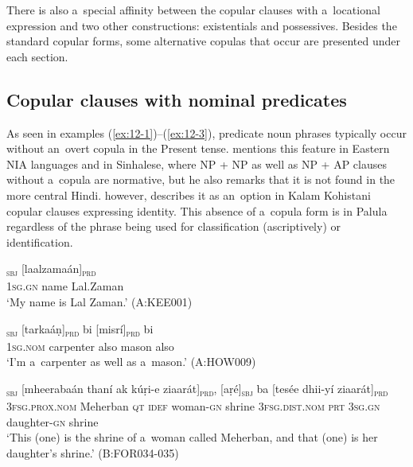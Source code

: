 There is also a~special affinity between the copular clauses with a~locational expression and two other constructions: existentials and possessives. Besides the standard copular forms, some alternative copulas that occur are presented under each section.


\subsection{Copular clauses with nominal predicates}
\label{subsec:12-1-1}


As seen in examples (\ref{ex:12-1})--(\ref{ex:12-3}), predicate noun phrases typically occur without an~overt copula in the Present tense. \citet[337]{masica1991} mentions this feature in Eastern NIA languages and in Sinhalese, where NP + NP as well as NP + AP clauses without a~copula are normative, but he also remarks that it is not found in the more central Hindi. \citet[118--122]{baart1999a} however, describes it as an~option in Kalam Kohistani copular clauses expressing identity. This absence of a~copula form is in Palula regardless of the phrase being used for classification (ascriptively) or identification. 

\begin{exe}
\ex
\label{ex:12-1}
\textsubscript{\textsc{sbj}} [laalzamaán]\textsubscript{\textsc{prd}} \\
\textsc{1sg.gn} name Lal.Zaman  \\
\glt `My name is Lal Zaman.' (A:KEE001)
\end{exe}
\begin{exe}
\ex
\label{ex:12-2}
\gll [ma]\textsubscript{\textsc{sbj}} [tarkaáṇ]\textsubscript{\textsc{prd}} bi
     [misrí]\textsubscript{\textsc{prd}} bi \\
\textsc{1sg.nom} carpenter also mason also  \\
\glt `I'm a~carpenter as well as a~mason.' (A:HOW009)

\ex
\label{ex:12-3}
\gll [aní]\textsubscript{\textsc{sbj}} [mheerabaán thaní ak kúṛi-e ziaarát]\textsubscript{\textsc{prd}}, [aṛé]\textsubscript{\textsc{sbj}} ba [tesée dhii-yí ziaarát]\textsubscript{\textsc{prd}} \\
\textsc{3fsg.prox.nom} Meherban \textsc{qt} \textsc{idef} woman-\textsc{gn}  shrine \textsc{3fsg.dist.nom} \textsc{prt} \textsc{3sg.gn} daughter-\textsc{gn}  shrine \\
\glt `This (one) is the shrine of a~woman called Meherban, and that (one) is her daughter's shrine.' (B:FOR034-035)
\end{exe}

